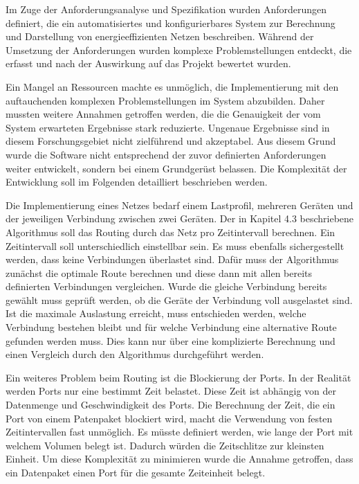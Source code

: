 Im Zuge der Anforderungsanalyse und Spezifikation wurden Anforderungen definiert, die ein automatisiertes und konfigurierbares System zur Berechnung und Darstellung von energieeffizienten Netzen beschreiben. Während der Umsetzung der Anforderungen wurden komplexe Problemstellungen entdeckt, die erfasst und nach der Auswirkung auf das Projekt bewertet wurden. 

Ein Mangel an Ressourcen machte es unmöglich, die Implementierung mit den auftauchenden komplexen Problemstellungen im System abzubilden. Daher mussten weitere Annahmen getroffen werden, die die Genauigkeit der vom System erwarteten Ergebnisse stark reduzierte. Ungenaue Ergebnisse sind in diesem Forschungsgebiet nicht zielführend und akzeptabel. Aus diesem Grund wurde die Software nicht entsprechend der zuvor definierten Anforderungen weiter entwickelt, sondern bei einem Grundgerüst belassen. Die Komplexität der Entwicklung soll im Folgenden detailliert beschrieben werden.  

Die Implementierung eines Netzes bedarf einem Lastprofil, mehreren Geräten und der jeweiligen Verbindung zwischen zwei Geräten. Der in Kapitel 4.3 beschriebene Algorithmus soll das Routing durch das Netz pro Zeitintervall berechnen. Ein Zeitintervall soll unterschiedlich einstellbar sein. Es muss ebenfalls sichergestellt werden, dass keine Verbindungen überlastet sind. Dafür muss der Algorithmus zunächst die optimale Route berechnen und diese dann mit allen bereits definierten Verbindungen vergleichen. Wurde die gleiche Verbindung bereits gewählt muss geprüft werden, ob die Geräte der Verbindung voll ausgelastet sind. Ist die maximale Auslastung erreicht, muss entschieden werden, welche Verbindung bestehen bleibt und für welche Verbindung eine alternative Route gefunden werden muss. Dies kann nur über eine komplizierte Berechnung und einen Vergleich durch den Algorithmus durchgeführt werden. 

Ein weiteres Problem beim Routing ist die Blockierung der Ports. In der Realität werden Ports nur eine bestimmt Zeit belastet. Diese Zeit ist abhängig von der Datenmenge und Geschwindigkeit des Ports. Die Berechnung der Zeit, die ein Port von einem Patenpaket blockiert wird, macht  die Verwendung von festen Zeitintervallen fast unmöglich. Es müsste  definiert werden, wie lange der Port mit welchem Volumen belegt ist. Dadurch würden die Zeitschlitze zur kleinsten Einheit. Um diese Komplexität zu minimieren wurde die Annahme getroffen, dass ein Datenpaket einen Port für die gesamte Zeiteinheit belegt. 

